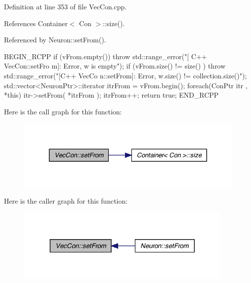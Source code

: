 Definition at line 353 of file VecCon.cpp.



References Container$<$ Con $>$::size().



Referenced by Neuron::setFrom().


\begin{DoxyCode}
                                                     {
        BEGIN_RCPP
                if (vFrom.empty()) { throw std::range_error("[ C++ VecCon::setFro
      m]: Error, w is empty"); }
                if (vFrom.size() != size() ) { throw std::range_error("[C++ VecCo
      n::setFrom]: Error, w.size() != collection.size()"); }
                std::vector<NeuronPtr>::iterator itrFrom = vFrom.begin();
                foreach(ConPtr itr , *this)     {
                        itr->setFrom( *itrFrom );
                        itrFrom++;
                }
                return true;
                END_RCPP
}
\end{DoxyCode}


Here is the call graph for this function:\nopagebreak
\begin{figure}[H]
\begin{center}
\leavevmode
\includegraphics[width=328pt]{class_vec_con_ad5327f9345cc4dee223ba7f1038ad9ec_cgraph}
\end{center}
\end{figure}




Here is the caller graph for this function:\nopagebreak
\begin{figure}[H]
\begin{center}
\leavevmode
\includegraphics[width=300pt]{class_vec_con_ad5327f9345cc4dee223ba7f1038ad9ec_icgraph}
\end{center}
\end{figure}



